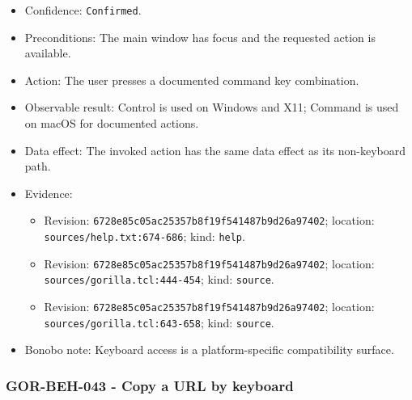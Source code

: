 \documentclass[
  letterpaper,
]{article}
\newcommand{\passthrough}[1]{#1}
\providecommand{\tightlist}{%
  \setlength{\itemsep}{0pt}\setlength{\parskip}{0pt}}
\begin{document}
\begin{itemize}
\tightlist
\item
  Confidence: \passthrough{\lstinline!Confirmed!}.
\item
  Preconditions: The main window has focus and the requested action is available.
\item
  Action: The user presses a documented command key combination.
\item
  Observable result: Control is used on Windows and X11; Command is used on macOS for documented actions.
\item
  Data effect: The invoked action has the same data effect as its non-keyboard path.
\item
  Evidence:

  \begin{itemize}
  \tightlist
  \item
    Revision: \nolinkurl{6728e85c05ac25357b8f19f541487b9d26a97402}; location: \nolinkurl{sources/help.txt:674-686};
    kind: \passthrough{\lstinline!help!}.
  \item
    Revision: \nolinkurl{6728e85c05ac25357b8f19f541487b9d26a97402}; location: \nolinkurl{sources/gorilla.tcl:444-454};
    kind: \passthrough{\lstinline!source!}.
  \item
    Revision: \nolinkurl{6728e85c05ac25357b8f19f541487b9d26a97402}; location: \nolinkurl{sources/gorilla.tcl:643-658};
    kind: \passthrough{\lstinline!source!}.
  \end{itemize}
\item
  Bonobo note: Keyboard access is a platform-specific compatibility surface.
\end{itemize}

\subsubsection{GOR-BEH-043 - Copy a URL by keyboard}\label{gor-beh-043---copy-a-url-by-keyboard}
\end{document}
